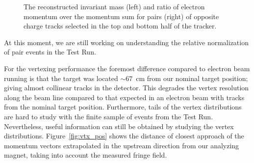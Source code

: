 \begin{figure}[ht]
\caption{\small{The reconstructed invariant mass (left) and ratio of electron momentum over the momentum sum for pairs (right) of opposite charge tracks selected in the top and bottom half of the tracker.}}
\label{fig:pair_kin}
\end{figure}
At this moment, we are still working on understanding the relative normalization of pair events in the Test 
Run. 


For the vertexing 
performance the foremost difference compared to electron beam running is that the target was 
located $\sim67$~cm from our nominal target position; giving almost collinear tracks in the detector. This 
degrades the vertex resolution along the 
beam line compared to that expected in an electron beam with tracks from the nominal target position. 
Furthermore, tails of the vertex distributions are hard to study with the finite sample of events from the 
Test Run. 
Nevertheless, useful information can still be 
obtained by studying the vertex distributions. Figure~\ref{fig:vtx_pos} shows the distance of closest 
approach of the momentum vectors extrapolated in the 
upstream direction from our analyzing magnet, taking into account the measured fringe field. 
